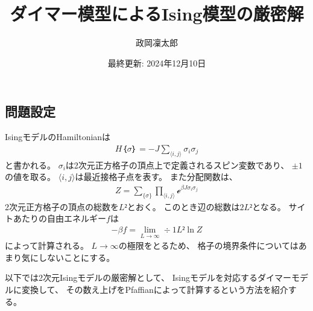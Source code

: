 \documentclass[12pt]{ltjsarticle}
\begin{document}
\title{ダイマー模型によるIsing模型の厳密解}
\author{政岡凜太郎}
\date{最終更新: 2024年12月10日}
\maketitle

\subsection*{
    問題設定
}
IsingモデルのHamiltonianは
\begin{align}
    H｛σ｝ = -J∑_{⟨i,j⟩}σ_iσ_j
\end{align}
と書かれる。
$σ_i$は2次元正方格子の頂点上で定義されるスピン変数であり、
$±1$の値を取る。
$⟨i,j⟩$は最近接格子点を表す。
また分配関数は、
\begin{align}
    Z = ∑_{\{σ\}}∏_{⟨i,j⟩}ℯ^{βJσ_iσ_j}
\end{align}
2次元正方格子の頂点の総数を$L²$とおく。
このとき辺の総数は$2L²$となる。
サイトあたりの自由エネルギー$f$は
\begin{align}
    -βf = \lim_{L → ∞}÷1{L²}\ln Z
\end{align}
によって計算される。
$L → ∞$の極限をとるため、
格子の境界条件についてはあまり気にしないことにする。

以下では2次元Isingモデルの厳密解として、
Isingモデルを対応するダイマーモデルに変換して、
その数え上げをPfaffianによって計算するという方法を紹介する。
\end{document}
